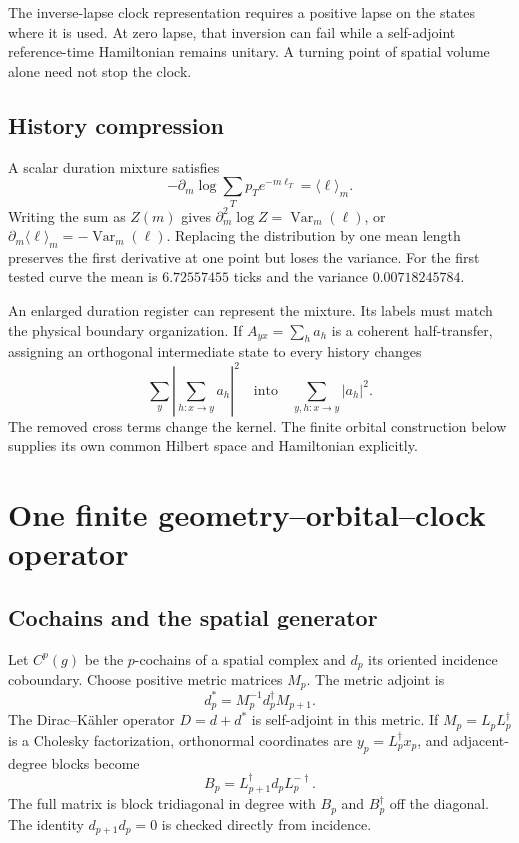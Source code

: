 The inverse-lapse clock representation requires a positive lapse on the states where it is used. At zero lapse, that inversion can fail while a self-adjoint reference-time Hamiltonian remains unitary. A turning point of spatial volume alone need not stop the clock.

\subsection{History compression}

A scalar duration mixture satisfies
\begin{equation}
-\partial_m\log\sum_Tp_Te^{-m\ell_T}
=\langle\ell\rangle_m.
\end{equation}
Writing the sum as $Z(m)$ gives $\partial_m^2\log Z=\operatorname{Var}_m(\ell)$, or $\partial_m\langle\ell\rangle_m=-\operatorname{Var}_m(\ell)$. Replacing the distribution by one mean length preserves the first derivative at one point but loses the variance. For the first tested curve the mean is $6.72557455$ ticks and the variance $0.00718245784$.

An enlarged duration register can represent the mixture. Its labels must match the physical boundary organization. If $A_{yx}=\sum_h a_h$ is a coherent half-transfer, assigning an orthogonal intermediate state to every history changes
\begin{equation}
\sum_y\left|\sum_{h:x\to y}a_h\right|^2
\quad\text{into}\quad
\sum_{y,h:x\to y}|a_h|^2.
\end{equation}
The removed cross terms change the kernel. The finite orbital construction below supplies its own common Hilbert space and Hamiltonian explicitly.

\section{One finite geometry--orbital--clock operator}
\label{sec:joint}

\subsection{Cochains and the spatial generator}

Let $C^p(g)$ be the $p$-cochains of a spatial complex and $d_p$ its oriented incidence coboundary. Choose positive metric matrices $M_p$. The metric adjoint is
\begin{equation}
d_p^*=M_p^{-1}d_p^\dagger M_{p+1}.
\end{equation}
The Dirac--Kähler operator $D=d+d^*$ is self-adjoint in this metric. If $M_p=L_pL_p^\dagger$ is a Cholesky factorization, orthonormal coordinates are $y_p=L_p^\dagger x_p$, and adjacent-degree blocks become
\begin{equation}
B_p=L_{p+1}^\dagger d_pL_p^{-\dagger}.
\end{equation}
The full matrix is block tridiagonal in degree with $B_p$ and $B_p^\dagger$ off the diagonal. The identity $d_{p+1}d_p=0$ is checked directly from incidence.

